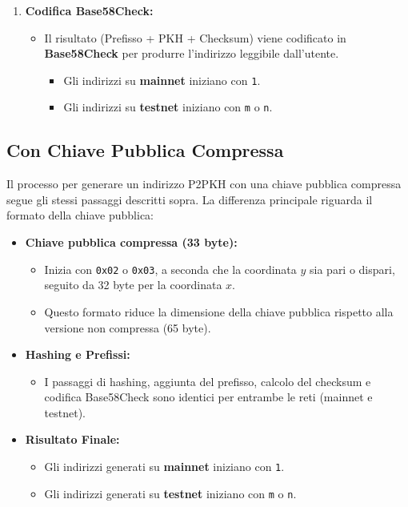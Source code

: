 \documentclass[a4paper,12pt]{article}
\begin{document}
\begin{enumerate}
    \item \textbf{Codifica Base58Check:}
    \begin{itemize}
        \item Il risultato (Prefisso + PKH + Checksum) viene codificato in \textbf{Base58Check} per produrre l'indirizzo leggibile dall'utente.
        \begin{itemize}
            \item Gli indirizzi su \textbf{mainnet} iniziano con \texttt{1}.
            \item Gli indirizzi su \textbf{testnet} iniziano con \texttt{m} o \texttt{n}.
        \end{itemize}
    \end{itemize}
\end{enumerate}

\subsection{Con Chiave Pubblica Compressa}
Il processo per generare un indirizzo P2PKH con una chiave pubblica compressa segue gli stessi passaggi descritti sopra. La differenza principale riguarda il formato della chiave pubblica:
\begin{itemize}
    \item \textbf{Chiave pubblica compressa (33 byte):}
    \begin{itemize}
        \item Inizia con \texttt{0x02} o \texttt{0x03}, a seconda che la coordinata \(y\) sia pari o dispari, seguito da 32 byte per la coordinata \(x\).
        \item Questo formato riduce la dimensione della chiave pubblica rispetto alla versione non compressa (65 byte).
    \end{itemize}
    \item \textbf{Hashing e Prefissi:}
    \begin{itemize}
        \item I passaggi di hashing, aggiunta del prefisso, calcolo del checksum e codifica Base58Check sono identici per entrambe le reti (mainnet e testnet).
    \end{itemize}
    \item \textbf{Risultato Finale:}
    \begin{itemize}
        \item Gli indirizzi generati su \textbf{mainnet} iniziano con \texttt{1}.
        \item Gli indirizzi generati su \textbf{testnet} iniziano con \texttt{m} o \texttt{n}.
    \end{itemize}
\end{itemize}
\end{document}

